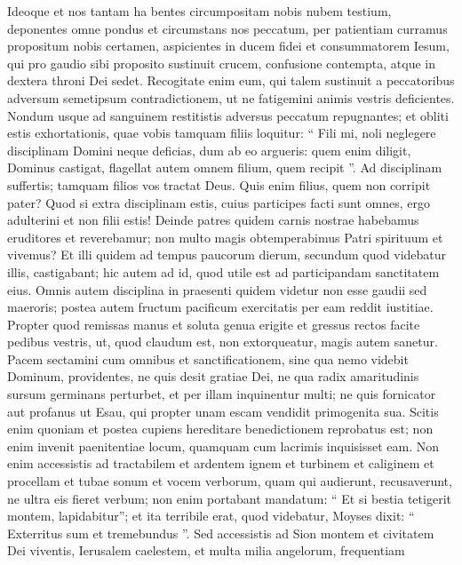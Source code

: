 \begin{biblechapter}
\begin{biblechapter}
\begin{biblechapter}
\begin{biblechapter}
\begin{biblechapter}
\begin{biblechapter}
\begin{biblechapter}
\begin{biblechapter}
\begin{biblechapter}
\begin{biblechapter}
\begin{biblechapter}
\begin{biblechapter}
\verse Ideoque et nos tantam ha bentes circumpositam nobis nubem testium, deponentes omne pondus et circumstans nos peccatum, per patientiam curramus propositum nobis certamen, 
\verse aspicientes in ducem fidei et consummatorem Iesum, qui pro gaudio sibi proposito sustinuit crucem, confusione contempta, atque in dextera throni Dei sedet. 
\verse Recogitate enim eum, qui talem sustinuit a peccatoribus adversum semetipsum contradictionem, ut ne fatigemini animis vestris deficientes.
 \verse Nondum usque ad sanguinem restitistis adversus peccatum repugnantes; 
\verse et obliti estis exhortationis, quae vobis tamquam filiis loquitur:
 “ Fili mi, noli neglegere disciplinam Domini
 neque deficias, dum ab eo argueris:
 \verse quem enim diligit, Dominus castigat,
 flagellat autem omnem filium, quem recipit ”.
 \verse Ad disciplinam suffertis; tamquam filios vos tractat Deus. Quis enim filius, quem non corripit pater? 
\verse Quod si extra disciplinam estis, cuius participes facti sunt omnes, ergo adulterini et non filii estis! 
\verse Deinde patres quidem carnis nostrae habebamus eruditores et reverebamur; non multo magis obtemperabimus Patri spirituum et vivemus? 
\verse Et illi quidem ad tempus paucorum dierum, secundum quod videbatur illis, castigabant; hic autem ad id, quod utile est ad participandam sanctitatem eius. 
\verse Omnis autem disciplina in praesenti quidem videtur non esse gaudii sed maeroris; postea autem fructum pacificum exercitatis per eam reddit iustitiae.
 \verse Propter quod remissas manus et soluta genua erigite 
\verse et gressus rectos facite pedibus vestris, ut, quod claudum est, non extorqueatur, magis autem sanetur.
 \verse Pacem sectamini cum omnibus et sanctificationem, sine qua nemo videbit Dominum, 
\verse providentes, ne quis desit gratiae Dei, ne qua radix amaritudinis sursum germinans perturbet, et per illam inquinentur multi; 
 \verse ne quis fornicator aut profanus ut Esau, qui propter unam escam vendidit primogenita sua. 
\verse Scitis enim quoniam et postea cupiens hereditare benedictionem reprobatus est; non enim invenit paenitentiae locum, quamquam cum lacrimis inquisisset eam.
 \verse Non enim accessistis ad tractabilem et ardentem ignem et turbinem et caliginem et procellam 
\verse et tubae sonum et vocem verborum, quam qui audierunt, recusaverunt, ne ultra eis fieret verbum; 
\verse non enim portabant mandatum: “ Et si bestia tetigerit montem, lapidabitur”; 
\verse et ita terribile erat, quod videbatur, Moyses dixit: “ Exterritus sum et tremebundus ”. 
\verse Sed accessistis ad Sion montem et civitatem Dei viventis, Ierusalem caelestem, et multa milia angelorum, frequentiam 

\end{biblechapter}
\end{biblechapter}
\end{biblechapter}
\end{biblechapter}
\end{biblechapter}
\end{biblechapter}
\end{biblechapter}
\end{biblechapter}
\end{biblechapter}
\end{biblechapter}
\end{biblechapter}
\end{biblechapter}

